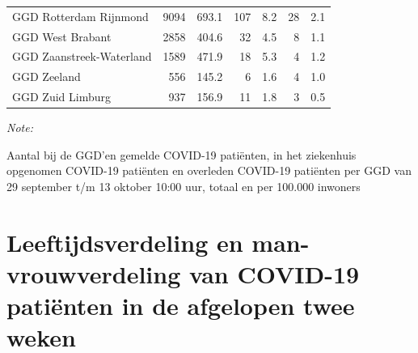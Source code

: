 \documentclass[
  english,
  man,floatsintext]{apa6}
\begin{document}
\begin{table}[H]
\begin{threeparttable}
\begin{tabular}{lrrrrrr}
GGD Rotterdam Rijnmond & 9094 & 693.1 & 107 & 8.2 & 28 & 2.1\\
GGD West Brabant & 2858 & 404.6 & 32 & 4.5 & 8 & 1.1\\
GGD Zaanstreek-Waterland & 1589 & 471.9 & 18 & 5.3 & 4 & 1.2\\
GGD Zeeland & 556 & 145.2 & 6 & 1.6 & 4 & 1.0\\
GGD Zuid Limburg & 937 & 156.9 & 11 & 1.8 & 3 & 0.5\\
\bottomrule
\end{tabular}
\begin{tablenotes}
\item \textit{Note: } 
\item Aantal bij de GGD’en gemelde COVID-19 patiënten, in het ziekenhuis opgenomen COVID-19 patiënten en overleden COVID-19 patiënten per GGD van 29 september t/m 13 oktober 10:00 uur, totaal en per 100.000 inwoners
\end{tablenotes}
\end{threeparttable}
\endgroup{}
\end{table}

\newpage

\hypertarget{leeftijdsverdeling-en-man-vrouwverdeling-van-covid-19-patiuxebnten-in-de-afgelopen-twee-weken}{%
\section{Leeftijdsverdeling en man-vrouwverdeling van COVID-19 patiënten in de afgelopen twee weken}\label{leeftijdsverdeling-en-man-vrouwverdeling-van-covid-19-patiuxebnten-in-de-afgelopen-twee-weken}}
\end{document}
